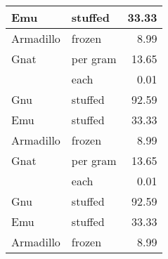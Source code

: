 {\begin{longtable}[l]{|l||l|r|}
\hline
Emu       & stuffed  & 33.33 \\
\hline
Armadillo & frozen   & 8.99  \\
\hline
Gnat      & per gram & 13.65 \\
\hline
          & each     & 0.01  \\
\hline
Gnu       & stuffed  & 92.59 \\
\hline
Emu       & stuffed  & 33.33 \\
\hline
Armadillo & frozen   & 8.99  \\
\hline
Gnat      & per gram & 13.65 \\
\hline
          & each     & 0.01  \\
\hline
Gnu       & stuffed  & 92.59 \\
\hline
Emu       & stuffed  & 33.33 \\
\hline
Armadillo & frozen   & 8.99  \\
\hline
\end{longtable}
}
